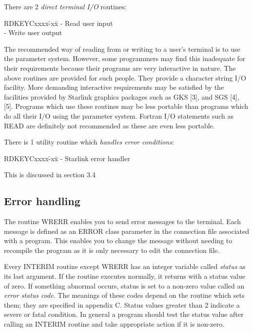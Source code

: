 \documentclass{article}
\begin{document}
There are 2 {\em direct terminal I/O} routines:
\begin{tabbing}
\hspace{40mm}RDKEYCxxxx\=-xx\=\kill
\hspace{40mm}{\bf RDUSER} \>- \>Read user input\\
\hspace{40mm}{\bf WRUSER} \>- \>Write user output
\end{tabbing}
The recommended way of reading from or writing to  a user's terminal is to use
the parameter system.
However, some programmers may find this inadequate for their requirements
because their programs are very interactive in nature.
The above routines are provided for such people.
They provide a character string I/O facility.
More demanding interactive requirements may be satisfied by the facilities
provided by Starlink graphics packages such as GKS [3], and SGS [4], [5].
Programs which use these routines may be less portable than programs which
do all their I/O using the parameter system.
Fortran I/O statements such as READ are definitely not recommended as these
are even less portable.

There is 1 utility routine which {\em handles error conditions}:
\begin{tabbing}
\hspace{40mm}RDKEYCxxxx\=-xx\=\kill
\hspace{40mm}{\bf STLERR} \>- \>Starlink error handler
\end{tabbing}
This is discussed in section 3.4
\subsection {Error handling}
The routine WRERR enables you to send error messages to the terminal.
Each message is defined as an ERROR class parameter in the connection file
associated with a program.
This enables you to change the message without needing to recompile
the program as it is only necessary to edit the connection file.

Every INTERIM routine except WRERR has an integer variable called {\em status}
as its last argument.
If the routine executes normally, it returns with a status value of zero.
If something abnormal occurs, status is set to a non-zero value called an
{\em error status code}.
The meanings of these codes depend on the routine which sets them; they are
specified in appendix C.
Status values greater than 2 indicate a severe or fatal condition.
In general a program should test the status value after calling an INTERIM
routine and take appropriate action if it is non-zero.
\end{document}
